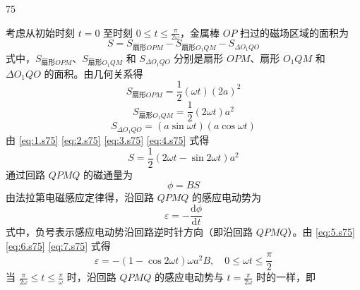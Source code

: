 \begin{solution}{75}
    \begin{subsolution}
        考虑从初始时刻 $t=0$ 至时刻 $0 \leq t \leq \frac{\pi}{2\omega}$，金属棒 $OP$ 扫过的磁场区域的面积为
        \begin{equation}
            S = S_{\text{扇形}OPM} - S_{\text{扇形}O_{1}QM} - S_{\Delta O_{1}QO}
            \label{eq:1.s75}
        \end{equation}
        式中，$S_{\text{扇形}OPM}$、$S_{\text{扇形}O_{1}QM}$ 和 $S_{\Delta O_{1}QO}$ 分别是扇形 $OPM$、扇形 $O_{1}QM$ 和 $\Delta O_{1}QO$ 的面积。由几何关系得
        \begin{equation}
            S_{\text{扇形}OPM} = \frac{1}{2} (\omega t) (2 a)^{2}
            \label{eq:2.s75}
        \end{equation}
        \begin{equation}
            S_{\text{扇形}O_{1}QM} = \frac{1}{2} (2 \omega t) a^{2}
            \label{eq:3.s75}
        \end{equation}
        \begin{equation}
            S_{\Delta O_{1}QO} = (a \sin \omega t)(a \cos \omega t)
            \label{eq:4.s75}
        \end{equation}
        由 \eqref{eq:1.s75} \eqref{eq:2.s75} \eqref{eq:3.s75} \eqref{eq:4.s75} 式得
        \begin{equation}
            S = \frac{1}{2} (2 \omega t - \sin 2 \omega t) a^{2}
            \label{eq:5.s75}
        \end{equation}
        通过回路 $QPMQ$ 的磁通量为
        \begin{equation}
            \phi = B S
            \label{eq:6.s75}
        \end{equation}
        由法拉第电磁感应定律得，沿回路 $QPMQ$ 的感应电动势为
        \begin{equation}
            \varepsilon = - \frac{\mathrm{d} \phi}{\mathrm{d} t}
            \label{eq:7.s75}
        \end{equation}
        式中，负号表示感应电动势沿回路逆时针方向（即沿回路 $QPMQ$）。由 \eqref{eq:5.s75} \eqref{eq:6.s75} \eqref{eq:7.s75} 式得
        \begin{equation}
            \varepsilon = - (1 - \cos 2 \omega t) \omega a^{2} B,\quad 0 \leq \omega t \leq \frac{\pi}{2}
            \label{eq:8.s75}
        \end{equation}
        当 $\frac{\pi}{2\omega} \leq t \leq \frac{\pi}{\omega}$ 时，沿回路 $QPMQ$ 的感应电动势与 $t = \frac{\pi}{2\omega}$ 时的一样，即

\end{subsolution}
\end{solution}
